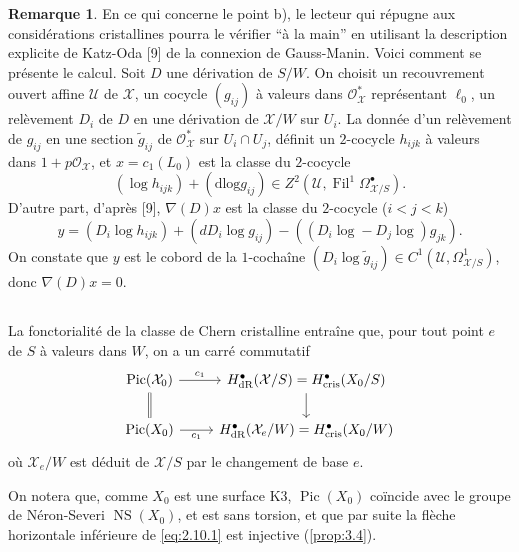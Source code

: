 \documentclass[12pt,a4paper]{article}
\theoremstyle{plain}
\theoremstyle{definition}
\newtheorem{remark}[theorem]{Remarque}
\theoremstyle{remark}
\DeclareMathOperator{\Pic}{Pic}
\DeclareMathOperator{\Fil}{Fil}
\DeclareMathOperator{\NS}{NS}
\newcommand{\dlog}{\mathrm{dlog}}
\newcommand{\cris}{\mathrm{cris}}
\begin{document}
\begin{remark}\label{rem:2.9.5}
En ce qui concerne le point b), le lecteur qui répugne aux considérations cristallines pourra le vérifier ``à la main'' en utilisant la description explicite de Katz-Oda [9] de la connexion de Gauss-Manin. Voici comment se présente le calcul. Soit $D$ une dérivation de $S/W$. On choisit un recouvrement ouvert affine $\mathcal{U}$ de $\mathcal{X}$, un cocycle $(g_{ij})$ à valeurs dans $\mathcal{O}_{\mathcal{X}}^*$ représentant $\ell_0$, un relèvement $D_i$ de $D$ en une dérivation de $\mathcal{X}/W$ sur $U_i$. La donnée d'un relèvement de $g_{ij}$ en une section $\tilde{g}_{ij}$ de $\mathcal{O}_{\mathcal{X}}^*$ sur $U_i \cap U_j$, définit un $2$-cocycle $h_{ijk}$ à valeurs dans $1 + p\mathcal{O}_{\mathcal{X}}$, et $x = c_1(L_0)$ est la classe du $2$-cocycle
\[
(\log h_{ijk}) + (\dlog g_{ij}) \in Z^2(\mathcal{U}, \Fil^1 \Omega^{\bullet}_{\mathcal{X}/S}).
\]
D'autre part, d'après [9], $\nabla(D)x$ est la classe du $2$-cocycle ($i < j < k$)
\[
y = (D_i \log h_{ijk}) + (d D_i \log g_{ij}) - ((D_i \log - D_j \log) g_{jk}).
\]
On constate que $y$ est le cobord de la $1$-cochaîne $(D_i \log \tilde{g}_{ij}) \in C^1(\mathcal{U}, \Omega^1_{\mathcal{X}/S})$, donc $\nabla(D)x = 0$.
\end{remark}

\subsection{}

La fonctorialité de la classe de Chern cristalline entraîne que, pour tout point $e$ de $S$ à valeurs dans $W$, on a un carré commutatif
\begin{equation}\label{eq:2.10.1}
\begin{tikzcd}
\Pic(\mathcal{X}_0) \arrow[r, "c_1"] \arrow[d, equal] & H^{\bullet}_{\mathrm{dR}}(\mathcal{X}/S) = H^{\bullet}_{\cris}(X_0/S) \arrow[d] \\
\Pic(X_0) \arrow[r, "c_1"'] & H^{\bullet}_{\mathrm{dR}}(\mathcal{X}_e/W) = H^{\bullet}_{\cris}(X_0/W)
\end{tikzcd}
\end{equation}
où $\mathcal{X}_e/W$ est déduit de $\mathcal{X}/S$ par le changement de base $e$.

On notera que, comme $X_0$ est une surface K3, $\Pic(X_0)$ coïncide avec le groupe de Néron-Severi $\NS(X_0)$, et est sans torsion, et que par suite la flèche horizontale inférieure de \eqref{eq:2.10.1} est injective (\ref{prop:3.4}).
\end{document}
